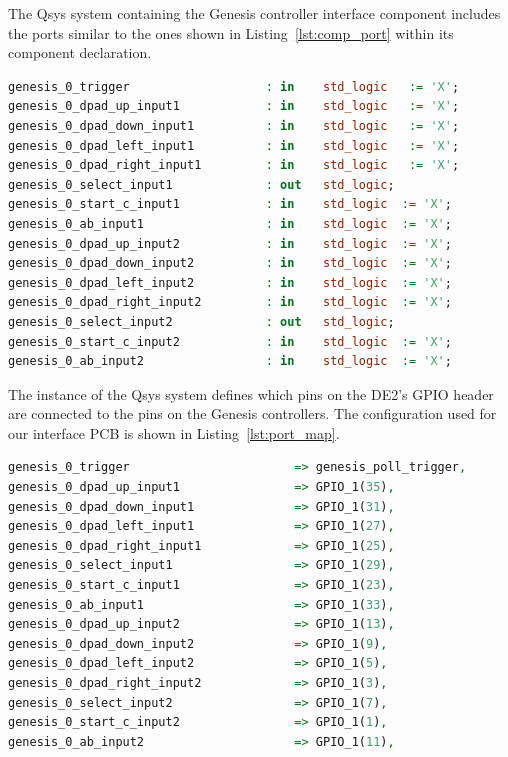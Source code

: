 \documentclass{capstonedoc}
\begin{document}
The Qsys system containing the Genesis controller interface component includes
the ports similar to the ones shown in Listing~\ref{lst:comp_port} within its
component declaration.

\begin{lstlisting}[language={vhdl},caption={Qsys System Ports for Genesis Controller},label={lst:comp_port}]
genesis_0_trigger                   : in    std_logic   := 'X';
genesis_0_dpad_up_input1            : in    std_logic   := 'X';
genesis_0_dpad_down_input1          : in    std_logic   := 'X';
genesis_0_dpad_left_input1          : in    std_logic   := 'X';
genesis_0_dpad_right_input1         : in    std_logic   := 'X';
genesis_0_select_input1             : out   std_logic;
genesis_0_start_c_input1            : in    std_logic  := 'X';
genesis_0_ab_input1                 : in    std_logic  := 'X';
genesis_0_dpad_up_input2            : in    std_logic  := 'X';
genesis_0_dpad_down_input2          : in    std_logic  := 'X';
genesis_0_dpad_left_input2          : in    std_logic  := 'X';
genesis_0_dpad_right_input2         : in    std_logic  := 'X';
genesis_0_select_input2             : out   std_logic;
genesis_0_start_c_input2            : in    std_logic  := 'X';
genesis_0_ab_input2                 : in    std_logic  := 'X';
\end{lstlisting}

The instance of the Qsys system defines which pins on the DE2's GPIO header are
connected to the pins on the Genesis controllers. The configuration used for our
interface PCB is shown in Listing~\ref{lst:port_map}.

\begin{lstlisting}[language={vhdl},caption={Port Map Configuration},label={lst:port_map}]
genesis_0_trigger                       => genesis_poll_trigger,
genesis_0_dpad_up_input1                => GPIO_1(35),
genesis_0_dpad_down_input1              => GPIO_1(31),
genesis_0_dpad_left_input1              => GPIO_1(27),
genesis_0_dpad_right_input1             => GPIO_1(25),
genesis_0_select_input1                 => GPIO_1(29),
genesis_0_start_c_input1                => GPIO_1(23),
genesis_0_ab_input1                     => GPIO_1(33),
genesis_0_dpad_up_input2                => GPIO_1(13),
genesis_0_dpad_down_input2              => GPIO_1(9),
genesis_0_dpad_left_input2              => GPIO_1(5),
genesis_0_dpad_right_input2             => GPIO_1(3),
genesis_0_select_input2                 => GPIO_1(7),
genesis_0_start_c_input2                => GPIO_1(1),
genesis_0_ab_input2                     => GPIO_1(11),
\end{lstlisting}
\end{document}
